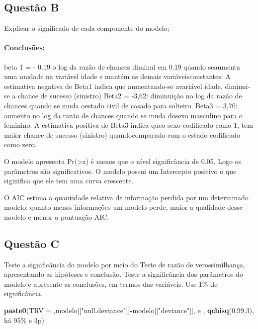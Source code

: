 \documentclass[
]{article}
\newenvironment{Shaded}{\begin{snugshade}}{\end{snugshade}}
\newcommand{\DecValTok}[1]{\textcolor[rgb]{0.00,0.00,0.81}{#1}}
\newcommand{\FloatTok}[1]{\textcolor[rgb]{0.00,0.00,0.81}{#1}}
\newcommand{\FunctionTok}[1]{\textcolor[rgb]{0.13,0.29,0.53}{\textbf{#1}}}
\newcommand{\NormalTok}[1]{#1}
\newcommand{\SpecialCharTok}[1]{\textcolor[rgb]{0.81,0.36,0.00}{\textbf{#1}}}
\newcommand{\StringTok}[1]{\textcolor[rgb]{0.31,0.60,0.02}{#1}}
\begin{document}
\hypertarget{questuxe3o-b-1}{%
\subsection{Questão B}\label{questuxe3o-b-1}}

Explicar o significado de cada componente do modelo;

\hypertarget{conclusuxf5es-12}{%
\paragraph{Conclusões:}\label{conclusuxf5es-12}}

beta 1 = - 0.19 o log da razão de chances diminui em 0.19 quando
seaumenta uma unidade na variável idade e mantém as demais
variáveisconstantes. A estimativa negativa de Beta1 indica que
aumentando-se avariável idade, diminui-se a chance de sucesso (sinistro)
Beta2 = -3,62: diminuição no log da razão de chances quando se muda
oestado civil de casado para solteiro. Beta3 = 3,70: aumento no log da
razão de chances quando se muda dosexo masculino para o feminino. A
estimativa positiva de Beta3 indica queo sexo codificado como 1, tem
maior chance de sucesso (sinistro) quandocomparado com o estado
codificado como zero.

O modelo apresenta Pr(\textgreater\textbar z\textbar) é menos que o
nível significância de 0.05. Logo os parâmetros são significativos. O
modelo possui um Intercepto positivo o que siginifica que ele tem uma
curva crescente.

O AIC estima a quantidade relativa de informação perdida por um
determinado modelo: quanto menos informações um modelo perde, maior a
qualidade desse modelo e menor a pontuação AIC.

\hypertarget{questuxe3o-c-1}{%
\subsection{Questão C}\label{questuxe3o-c-1}}

Teste a significância do modelo por meio do Teste de razão de
verossimilhança, apresentando as hipóteses e conclusão. Teste a
significância dos parâmetros do modelo e apresente as conclusões, em
termos das variáveis. Use 1\% de significância.

\begin{Shaded}
\begin{Highlighting}[]
\FunctionTok{paste0}\NormalTok{(}\StringTok{\textquotesingle{}TRV = \textquotesingle{}}\NormalTok{,modelo[[}\StringTok{"null.deviance"}\NormalTok{]]}\SpecialCharTok{{-}}\NormalTok{modelo[[}\StringTok{"deviance"}\NormalTok{]],}\StringTok{\textquotesingle{} e \textquotesingle{}}\NormalTok{, }
       \FunctionTok{qchisq}\NormalTok{(}\FloatTok{0.99}\NormalTok{,}\DecValTok{3}\NormalTok{), }\StringTok{\textquotesingle{} há 95\% e 3p\textquotesingle{}}\NormalTok{)}
\end{Highlighting}
\end{Shaded}
\end{document}
